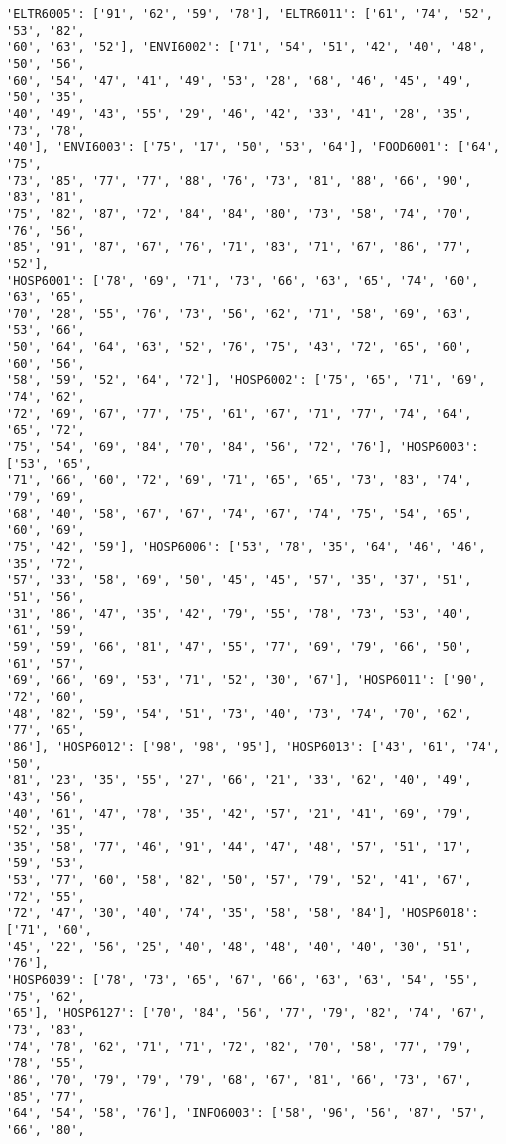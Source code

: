\documentclass[11pt]{article}
\begin{document}
\begin{Verbatim}[commandchars=\\\{\}]
'ELTR6005': ['91', '62', '59', '78'], 'ELTR6011': ['61', '74', '52', '53', '82',
'60', '63', '52'], 'ENVI6002': ['71', '54', '51', '42', '40', '48', '50', '56',
'60', '54', '47', '41', '49', '53', '28', '68', '46', '45', '49', '50', '35',
'40', '49', '43', '55', '29', '46', '42', '33', '41', '28', '35', '73', '78',
'40'], 'ENVI6003': ['75', '17', '50', '53', '64'], 'FOOD6001': ['64', '75',
'73', '85', '77', '77', '88', '76', '73', '81', '88', '66', '90', '83', '81',
'75', '82', '87', '72', '84', '84', '80', '73', '58', '74', '70', '76', '56',
'85', '91', '87', '67', '76', '71', '83', '71', '67', '86', '77', '52'],
'HOSP6001': ['78', '69', '71', '73', '66', '63', '65', '74', '60', '63', '65',
'70', '28', '55', '76', '73', '56', '62', '71', '58', '69', '63', '53', '66',
'50', '64', '64', '63', '52', '76', '75', '43', '72', '65', '60', '60', '56',
'58', '59', '52', '64', '72'], 'HOSP6002': ['75', '65', '71', '69', '74', '62',
'72', '69', '67', '77', '75', '61', '67', '71', '77', '74', '64', '65', '72',
'75', '54', '69', '84', '70', '84', '56', '72', '76'], 'HOSP6003': ['53', '65',
'71', '66', '60', '72', '69', '71', '65', '65', '73', '83', '74', '79', '69',
'68', '40', '58', '67', '67', '74', '67', '74', '75', '54', '65', '60', '69',
'75', '42', '59'], 'HOSP6006': ['53', '78', '35', '64', '46', '46', '35', '72',
'57', '33', '58', '69', '50', '45', '45', '57', '35', '37', '51', '51', '56',
'31', '86', '47', '35', '42', '79', '55', '78', '73', '53', '40', '61', '59',
'59', '59', '66', '81', '47', '55', '77', '69', '79', '66', '50', '61', '57',
'69', '66', '69', '53', '71', '52', '30', '67'], 'HOSP6011': ['90', '72', '60',
'48', '82', '59', '54', '51', '73', '40', '73', '74', '70', '62', '77', '65',
'86'], 'HOSP6012': ['98', '98', '95'], 'HOSP6013': ['43', '61', '74', '50',
'81', '23', '35', '55', '27', '66', '21', '33', '62', '40', '49', '43', '56',
'40', '61', '47', '78', '35', '42', '57', '21', '41', '69', '79', '52', '35',
'35', '58', '77', '46', '91', '44', '47', '48', '57', '51', '17', '59', '53',
'53', '77', '60', '58', '82', '50', '57', '79', '52', '41', '67', '72', '55',
'72', '47', '30', '40', '74', '35', '58', '58', '84'], 'HOSP6018': ['71', '60',
'45', '22', '56', '25', '40', '48', '48', '40', '40', '30', '51', '76'],
'HOSP6039': ['78', '73', '65', '67', '66', '63', '63', '54', '55', '75', '62',
'65'], 'HOSP6127': ['70', '84', '56', '77', '79', '82', '74', '67', '73', '83',
'74', '78', '62', '71', '71', '72', '82', '70', '58', '77', '79', '78', '55',
'86', '70', '79', '79', '79', '68', '67', '81', '66', '73', '67', '85', '77',
'64', '54', '58', '76'], 'INFO6003': ['58', '96', '56', '87', '57', '66', '80',

\end{Verbatim}
\end{document}
